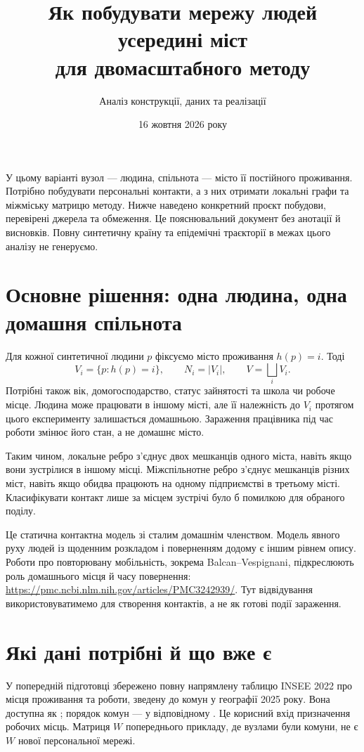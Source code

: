 \documentclass[11pt,a4paper]{article}
\title{Як побудувати мережу людей усередині міст\\для двомасштабного методу}
\author{Аналіз конструкції, даних та реалізації}
\date{16 жовтня 2026 року}
\begin{document}
\maketitle
\noindent У цьому варіанті вузол --- людина, спільнота --- місто її постійного проживання. Потрібно побудувати персональні контакти, а з них отримати локальні графи та міжміську матрицю методу. Нижче наведено конкретний проєкт побудови, перевірені джерела та обмеження. Це пояснювальний документ без анотації й висновків. Повну синтетичну країну та епідемічні траєкторії в межах цього аналізу не генеруємо.

\section{Основне рішення: одна людина, одна домашня спільнота}
Для кожної синтетичної людини $p$ фіксуємо місто проживання $h(p)=i$. Тоді
\[
V_i=\{p:h(p)=i\},\qquad N_i=|V_i|,\qquad V=\bigsqcup_iV_i.
\]
Потрібні також вік, домогосподарство, статус зайнятості та школа чи робоче місце. Людина може працювати в іншому місті, але її належність до $V_i$ протягом цього експерименту залишається домашньою. Зараження працівника під час роботи змінює його стан, а не домашнє місто.

Таким чином, локальне ребро з'єднує двох мешканців одного міста, навіть якщо вони зустрілися в іншому місці. Міжспільнотне ребро з'єднує мешканців різних міст, навіть якщо обидва працюють на одному підприємстві в третьому місті. Класифікувати контакт лише за місцем зустрічі було б помилкою для обраного поділу.

Це статична контактна модель зі сталим домашнім членством. Модель явного руху людей із щоденним розкладом і поверненням додому є іншим рівнем опису. Роботи про повторювану мобільність, зокрема Balcan--Vespignani, підкреслюють роль домашнього місця й часу повернення: \url{https://pmc.ncbi.nlm.nih.gov/articles/PMC3242939/}. Тут відвідування використовуватимемо для створення контактів, а не як готові події зараження.

\section{Які дані потрібні й що вже є}
У попередній підготовці збережено повну напрямлену таблицю INSEE 2022 про місця проживання та роботи, зведену до комун у географії 2025 року. Вона доступна як ; порядок комун --- у відповідному . Це корисний вхід призначення робочих місць. Матриця $W$ попереднього прикладу, де вузлами були комуни, не є $W$ нової персональної мережі.
\end{document}
